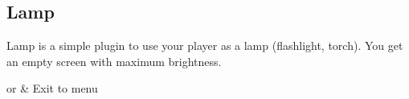 \subsection{Lamp}
Lamp is a simple plugin to use your player as a lamp (flashlight, torch).
You get an empty screen with maximum brightness.
\begin{btnmap}
    \PluginCancel{} or \PluginExit
    & Exit to menu\\
\end{btnmap}
